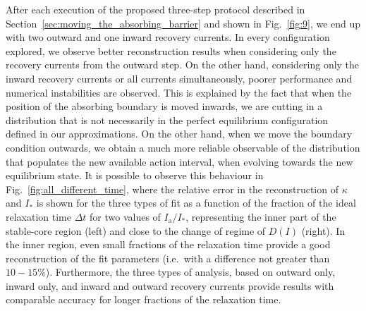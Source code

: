 After each execution of the proposed three-step protocol described in Section~\ref{sec:moving_the_absorbing_barrier} and shown in Fig.~\ref{fig:9}, we end up with two outward and one inward recovery currents. In every configuration explored, we observe better reconstruction results when considering only the recovery currents from the outward step. On the other hand, considering only the inward recovery currents or all currents simultaneously, poorer performance and numerical instabilities are observed. This is explained by the fact that when the position of the absorbing boundary is moved inwards, we are cutting in a distribution that is not necessarily in the perfect equilibrium configuration defined in our approximations. On the other hand, when we move the boundary condition outwards, we obtain a much more reliable observable of the distribution that populates the new available action interval, when evolving towards the new equilibrium state. It is possible to observe this behaviour in Fig.~\ref{fig:all_different_time}, where the relative error in the reconstruction of $\kappa$ and $I_\ast$ is shown for the three types of fit as a function of the fraction of the ideal relaxation time $\Delta t$ for two values of $I_\mathrm{a}/I_\ast$, representing the inner part of the stable-core region (left) and close to the change of regime of $D(I)$ (right). In the inner region, even small fractions of the relaxation time provide a good reconstruction of the fit parameters {(i.e.\ with a difference not greater than $10-15\%$)}. Furthermore, the three types of analysis, based on outward only, inward only, and inward and outward recovery currents provide results with comparable accuracy for longer fractions of the relaxation time.  
%
